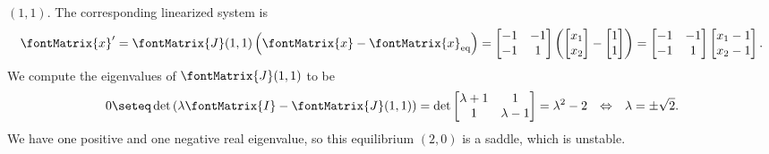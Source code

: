 {$(1,1)$. The corresponding linearized system is
\begin{align*}
\fontMatrix{x}'
=
\fontMatrix{J}(1,1) \left(\fontMatrix{x} - \fontMatrix{x}_{\text{eq}}\right)
=
\begin{bmatrix}%
-1	&	-1	\\
-1	&	1
\end{bmatrix}%
\left(
\begin{bmatrix}%
x_{1}	\\
x_{2}
\end{bmatrix}%
- 
\begin{bmatrix}%
1	\\
1
\end{bmatrix}%
\right)
=
\begin{bmatrix}%
-1	&	-1	\\
-1	&	1
\end{bmatrix}%
\begin{bmatrix}%
x_{1} - 1	\\
x_{2} - 1
\end{bmatrix}%
.
\end{align*}
We compute the eigenvalues of $\fontMatrix{J}(1,1)$ to be
\begin{align*}
0
\seteq
\det\left(\lambda \fontMatrix{I} - \fontMatrix{J}(1,1)\right)
=
\det
\begin{bmatrix}%
\lambda + 1	&	1			\\
1			&	\lambda - 1
\end{bmatrix}%
=
\lambda^{2} - 2
&&
\Leftrightarrow
&&
\lambda
=
\pm{}\sqrt{2}.
\end{align*}
We have one positive and one negative real eigenvalue, so this equilibrium $(2,0)$ is a saddle, which is unstable.

}%





%
%
%
%


